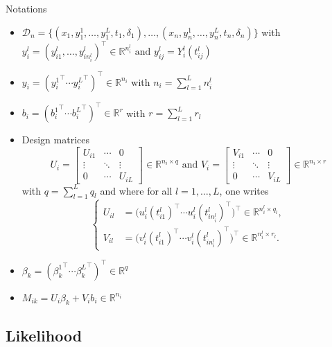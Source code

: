\documentclass{beamer}
\newcommand{\R}{\mathbb R}
\newcommand{\cD}{\mathcal D}
\begin{document}
\begin{frame}{Notations}

\footnotesize
\begin{itemize}
  \item<1-> $\cD_n = \big\{ (x_1, y_1^1, \ldots, y_1^L, t_1, \delta_1), \ldots, (x_n, y_n^1, \ldots, y_n^L, t_n, \delta_n) \big\}$ with $y_i^l=(y_{i1}^l, \ldots, y_{in_i^l}^l)^\top \in \R^{n_i^l} \text{ and } y_{ij}^l=Y_i^l(t_{ij}^l)$
  \item<2-> $y_i = ({y_i^1}^\top \cdots {y_i^L}^\top)^\top \in \R^{n_i}$ with $n_i = \sum_{l=1}^L n_i^l$
  \item<3-> $b_i = ({b_i^1}^\top \cdots {b_i^L}^\top)^\top \in \R^r$ with $r = \sum_{l=1}^L r_l$
  \item<4-> Design matrices 
  \[ U_i = 
\begin{bmatrix}
  U_{i1} & \cdots & 0\\
  \vdots &  \ddots & \vdots \\
  0 & \cdots & U_{iL}
\end{bmatrix} 
\in \R^{n_i \times q}
\text{ and }
V_i = 
\begin{bmatrix}
  V_{i1} & \cdots & 0\\
  \vdots &  \ddots & \vdots \\
  0 & \cdots & V_{iL}
\end{bmatrix}
\in \R^{n_i \times r}
\]
with $q = \sum_{l=1}^L q_l$ and where for all $l=1, \ldots, L$, one writes
\[
\left\{
    \begin{array}{ll}
        U_{il} &= \big(u_i^l(t_{i1}^l)^\top \cdots u_i^l(t_{in_i^l}^l)^\top\big)^\top \in \R^{n_i^l \times q_l},\\
        V_{il} &= \big(v_i^l(t_{i1}^l)^\top \cdots v_i^l(t_{in_i^l}^l)^\top\big)^\top \in \R^{n_i^l \times r_l}.
    \end{array}
\right.
\]
  \item<5-> $\beta_k = ({\beta_k^1}^\top \cdots {\beta_k^L}^\top)^\top \in \R^q$
  \item<6-> $M_{ik} = U_i\beta_k + V_ib_i \in \R^{n_i}$
\end{itemize}

\end{frame}

\subsection{Likelihood}
\end{document}
